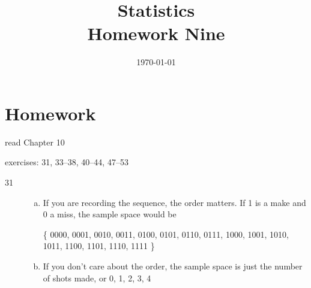 \documentclass[letterpaper, landscape]{exam}
\title{Statistics \\ Homework Nine}
\date{\today}
\author{}
\begin{document}
  \maketitle

  \section{Homework}
  \ifprintanswers{}
  \else
    \begin{itemize*}
      \item read Chapter 10 
      \item exercises: 31, 33--38, 40--44, 47--53
    \end{itemize*}
  \fi

  \ifprintanswers{}
    \begin{description}

      \item[31] 
        \begin{enumerate}[(a)]
          \item If you are recording the sequence, the order matters.  If 1 is a
            make and 0 a miss, the sample space would be 
            
            \{ 0000, 0001, 0010, 0011, 0100, 0101, 0110, 0111, 1000, 1001, 1010,
               1011, 1100, 1101, 1110, 1111 \}

          \item If you don't care about the order, the sample space is just the
            number of shots made, or {0, 1, 2, 3, 4 }

        \end{enumerate}





\end{description}
\end{document}
